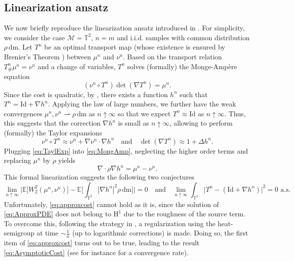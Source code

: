 \documentclass[11pt,a4paper,oneside]{amsart}
\numberwithin{equation}{section}
\newcommand{\dd}{\mathrm{d}}
\newcommand{\m}{\mathrm{m}}
\begin{document}
\subsection{Linearization ansatz}\label{sec:lin}
We now briefly reproduce the linearization ansatz introduced in \cite{caracciolo2014scaling}. For simplicity, we consider the case $\mathcal{M} = \mathbb{T}^2$, $n=m$ and i.i.d. samples with common distribution $\rho \, \dd \mathrm{m}$. Let $T^n$ be an optimal transport map (whose existence is ensured by Brenier's Theorem \cite{Brenier}) between $\mu^n$ and $\nu^n$. Based on the transport relation $T^n_{\#}\mu^n=\nu^n$ and a change of variables, $T^n$ solves (formally) the Monge-Amp\`ere equation 
%
\begin{equation}\label{eq:MongAmp}
%
(\nu^n\circ T^n) \det(\nabla T^n) = \mu^n.
%
\end{equation}
%
Since the cost is quadratic, by \cite[Theorem 1.25]{Santambrogio}, there exists a function $h^n$ such that $T^n= \mathrm{Id}+\nabla h^n$. Applying the law of large numbers, we further have the weak convergences $\mu^n,\nu^n {\rightharpoonup}\rho\, \dd \mathrm{m}$ as $n\uparrow \infty$ so that we expect $T^n\approx \mathrm{Id}$ as $n\uparrow\infty$. Thus, this suggests that the correction $\nabla h^n$ is small as $n\uparrow\infty$, allowing to perform (formally) the Taylor expansions
%
\begin{equation}\label{eq:TaylExp}
\nu^n \circ T^n \approx \nu^n + \nabla \nu^n\cdot\nabla h^n\quad\text{and}\quad \det(\nabla T^n) \approx 1 + \Delta h^n.
\end{equation}
%
Plugging \eqref{eq:TaylExp} into \eqref{eq:MongAmp}, neglecting the higher order terms and replacing $\mu^n$ by $\rho$ yields  
%
\begin{equation}\label{eq:ApproxPDE}
\nabla \cdot \rho \nabla h^n = \mu^n-\nu^n.
\end{equation}
%
This formal linearization suggests the following two conjectures 
%
\begin{equation}\label{eq:approxcost}
%
\lim_{n\uparrow\infty}\bigg\vert\mathbb{E}\big[W_2^2 (\mu^n, \nu^n)\big]-\mathbb{E}\bigg[\int_{\mathbb{T}^2} |\nabla h^n|^2\rho\,\dd\m\bigg]\bigg\vert=0\quad\text{and}\quad\lim_{n\uparrow\infty}\int_{\mathbb{T}^2}\vert T^n-(\text{Id}+\nabla h^n)\vert^2=0\text{ a.s.}
%
\end{equation}
%
Unfortunately, \eqref{eq:approxcost} cannot hold as it is, since the solution of \eqref{eq:ApproxPDE} does not belong to $\mathrm{H}^1$ due to the roughness of the source term. To overcome this, following the strategy in \cite{ambrosio2019pde}, a regularization using the heat-semigroup at time $\sim \frac{1}{n}$ (up to logarithmic corrections) is made. Doing so, the first item of \eqref{eq:approxcost} turns out to be true, leading to the result \eqref{eq:AsymptoticCost} (see for instance \cite{ambrosio2019finer} for a convergence rate). 
\end{document}
